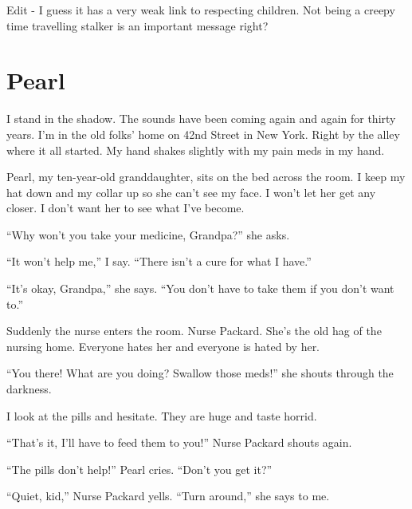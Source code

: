 Edit - I guess it has a very weak link to respecting children. Not
being a creepy time travelling stalker is an important message
right? 
 



\chapter{Pearl}



I stand in the shadow. The sounds have been coming again and again
for thirty years. I'm in the old folks' home on 42nd
Street in New York. Right by the alley where it all started. My
hand shakes slightly with my pain meds in my hand.



Pearl, my ten-year-old granddaughter, sits on the bed across the
room. I keep my hat down and my collar up so she can't see my
face. I won't let her get any closer. I don't want her
to see what I've become.



``Why won't you take your medicine, Grandpa?'' she
asks.



``It won't help me,'' I say. ``There
isn't a cure for what I have.''



``It's okay, Grandpa,'' she says. ``You
don't have to take them if you don't want
to.''



Suddenly the nurse enters the room. Nurse Packard. She's the
old hag of the nursing home. Everyone hates her and everyone is
hated by her.



``You there! What are you doing? Swallow those meds!''
she shouts through the darkness.



I look at the pills and hesitate. They are huge and taste
horrid.



``That's it, I'll have to feed them to you!''
Nurse Packard shouts again.



``The pills don't help!'' Pearl cries.
``Don't you get it?''



``Quiet, kid,'' Nurse Packard yells. ``Turn
around,'' she says to me.




